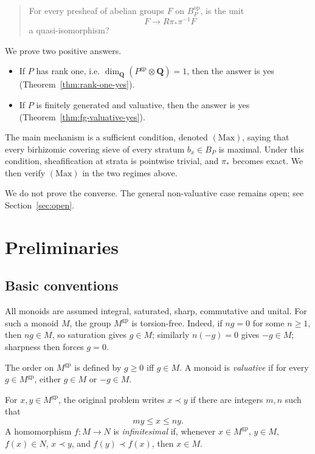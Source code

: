 \documentclass[12pt]{article}
\theoremstyle{definition}
\theoremstyle{remark}
\numberwithin{equation}{section}
\newcommand{\gp}{\mathrm{gp}}
\newcommand{\op}{\mathrm{op}}
\begin{document}
\begin{quote}
For every presheaf of abelian groups \(F\) on \(B_P^{\op}\), is the unit
\[
F \longrightarrow R\pi_*\pi^{-1}F
\]
a quasi-isomorphism?
\end{quote}

We prove two positive answers.

\begin{itemize}
\item If \(P\) has rank one, i.e. \(\dim_{\mathbf Q}(P^{\gp}\otimes\mathbf Q)=1\), then the answer is yes (Theorem~\ref{thm:rank-one-yes}).
\item If \(P\) is finitely generated and valuative, then the answer is yes (Theorem~\ref{thm:fg-valuative-yes}).
\end{itemize}

The main mechanism is a sufficient condition, denoted \((\mathrm{Max})\), saying that every birhizomic covering sieve of every stratum \(b_x\in B_P\) is maximal.  Under this condition, sheafification at strata is pointwise trivial, and \(\pi_*\) becomes exact.  We then verify \((\mathrm{Max})\) in the two regimes above.

We do not prove the converse.  The general non-valuative case remains open; see Section~\ref{sec:open}.

\section{Preliminaries}

\subsection{Basic conventions}

All monoids are assumed integral, saturated, sharp, commutative and unital.  For such a monoid \(M\), the group \(M^{\gp}\) is torsion-free.  Indeed, if \(ng=0\) for some \(n\geq 1\), then \(ng\in M\), so saturation gives \(g\in M\); similarly \(n(-g)=0\) gives \(-g\in M\); sharpness then forces \(g=0\).

The order on \(M^{\gp}\) is defined by \(g\geq 0\) iff \(g\in M\).  A monoid is \emph{valuative} if for every \(g\in M^{\gp}\), either \(g\in M\) or \(-g\in M\).

For \(x,y\in M^{\gp}\), the original problem writes \(x\prec y\) if there are integers \(m,n\) such that
\[
my\leq x\leq ny.
\]
A homomorphism \(f:M\to N\) is \emph{infinitesimal} if, whenever \(x\in M^{\gp}\), \(y\in M\), \(f(x)\in N\), \(x\prec y\), and \(f(y)\prec f(x)\), then \(x\in M\).
\end{document}
